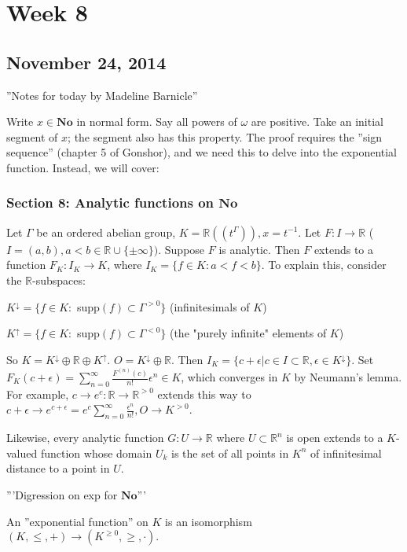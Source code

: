\section{ Week 8 }
\subsection{November 24, 2014}
''Notes for today by Madeline Barnicle''

Write $x \in \mathbf{No}$ in normal form. Say all powers of $\omega$ are positive. Take an initial segment of $x$; the segment also has this property. The proof requires the ''sign sequence'' (chapter 5 of Gonshor), and we need this to delve into the exponential function. Instead, we will cover:
\subsubsection{Section 8: Analytic functions on $\mathbf{No}$}
Let $\Gamma$ be an ordered abelian group, $K = \mathbb{R}((t^{\Gamma})), x=t^{-1}$. Let $F: I \rightarrow \mathbb{R}$ ($I=(a, b), a<b \in \mathbb{R} \cup \{\pm \infty \})$. Suppose $F$ is analytic. Then $F$ extends to a function $F_K : I_K \rightarrow K$, where $I_K = \{f \in K: a<f<b\}$. To explain this, consider the $\mathbb{R}$-subspaces:

$K^{\downarrow}=\{f \in K:$ supp$(f) \subset \Gamma^{> 0} \}$ (infinitesimals of $K$)

$K^{\uparrow}=\{f \in K:$ supp$(f) \subset \Gamma^{< 0} \}$ (the "purely infinite" elements of $K$)

So $K=K^{\downarrow} \oplus \mathbb{R} \oplus K^{\uparrow}$. $O=K^{\downarrow} \oplus \mathbb{R}$. Then $I_K=\{c+\epsilon | c \in I \subset \mathbb{R}, \epsilon \in K^{\downarrow}\}$. Set $F_K (c+\epsilon)=\sum_{n=0}^{\infty} \frac{F^{(n)}(c)}{n!}\epsilon^{n} \in K$, which converges in $K$ by Neumann's lemma. For example, $c \rightarrow e^c: \mathbb{R} \rightarrow \mathbb{R}^{> 0}$ extends this way to $c+\epsilon \rightarrow e^{c+\epsilon}=e^c \sum_{n=0}^{\infty} \frac{\epsilon^n}{n!}, O \rightarrow K^{> 0}$.

Likewise, every analytic function $G: U \rightarrow \mathbb{R}$ where $U \subset \mathbb{R}^n$ is open extends to a $K$-valued function whose domain $U_k$ is the set of all points in $K^n$ of infinitesimal distance to a point in $U$.

'''Digression on exp for $\mathbf{No}$'''

An ''exponential function'' on $K$ is an isomorphism $(K, \leq, +) \rightarrow (K^{\geq 0}, \geq, \cdot).$

